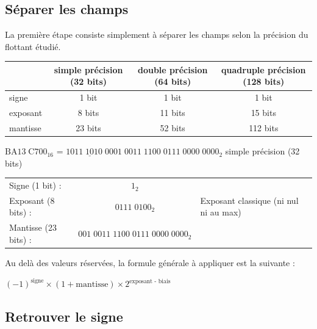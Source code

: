 \documentclass[11pt,a4paper]{article}
\begin{document}
\bigskip

\subsection{Séparer les champs}

\medskip

La première étape consiste simplement à séparer les champs selon la précision du flottant étudié.

\bigskip

\begin{tabular}{| l | c | c | c |}
\hline
         & simple précision (32 bits) & double précision (64 bits) & quadruple précision (128 bits) \\
\hline
signe    & 1 bit   & 1 bit   & 1 bit \\
\hline
exposant & 8 bits  & 11 bits & 15 bits \\
\hline
mantisse & 23 bits & 52 bits & 112 bits \\
\hline
\end{tabular}

\bigskip
\bigskip

$ \text{BA}13 \; \text{C}700_{16} $ = $ 1\underline{011 \; 1010 \; 0}001 \; 0011 \; 1100 \; 0111 \; 0000 \; 0000_{2} $  \hfill simple précision (32 bits) \hfill \phantom{Texte.}

\bigskip
\bigskip

\begin{tabular}{l c l}
Signe (1 bit) :      & $ 1_{2} $            & \\
Exposant (8 bits) :  & $ 0111 \; 0100_{2} $ & Exposant classique (ni nul ni au max)\\
Mantisse (23 bits) : & $ 001 \; 0011 \; 1100 \; 0111 \; 0000 \; 0000_{2} $ & \\
\end{tabular}

\bigskip
\bigskip

Au delà des valeurs réservées, la formule générale à appliquer est la suivante :
\begin{center}
$ (-1)^{\text{signe}} \times (1 + \text{mantisse}) \times 2^{\text{exposant - biais}} $
\end{center}


\bigskip

\subsection{Retrouver le signe}
\end{document}
